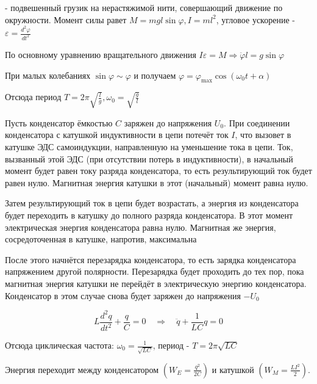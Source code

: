 \documentclass[12pt]{article}
\begin{document}
 - подвешенный грузик на нерастяжимой нити, совершающий движение по окружности.
Момент силы равет $M = m g l \sin \varphi, I = m l^2$, угловое ускорение - $\varepsilon = \frac{d^2 \varphi}{d t^2}$

По основному уравнению вращательного движения $I \varepsilon = M \Longrightarrow \ddot \varphi l = g \sin \varphi$

При малых колебаниях $\sin \varphi \sim \varphi$ и получаем $\varphi = \varphi_{\max} \cos (\omega_0 t + \alpha)$

Отсюда период $T = 2\pi\sqrt{\frac{l}{g}}, \omega_0 = \sqrt{\frac{g}{l}}$

Пусть конденсатор ёмкостью $C$ заряжен до напряжения $U_0$. 
При соединении конденсатора с катушкой индуктивности в цепи потечёт ток $I$, 
что вызовет в катушке ЭДС самоиндукции, направленную на уменьшение тока в цепи. 
Ток, вызванный этой ЭДС (при отсутствии потерь в индуктивности), 
в начальный момент будет равен току разряда конденсатора, то есть результирующий ток будет равен нулю. 
Магнитная энергия катушки в этот (начальный) момент равна нулю.

Затем результирующий ток в цепи будет возрастать, а энергия из конденсатора будет переходить 
в катушку до полного разряда конденсатора. В этот момент электрическая энергия конденсатора равна нулю. 
Магнитная же энергия, сосредоточенная в катушке, напротив, максимальна

После этого начнётся перезарядка конденсатора, то есть зарядка конденсатора напряжением другой полярности. 
Перезарядка будет проходить до тех пор, пока магнитная энергия катушки не перейдёт в электрическую энергию 
конденсатора. Конденсатор в этом случае снова будет заряжен до напряжения $-U_0$

\[
L\frac{d^2q}{dt^2} + \frac{q}{C} = 0 \quad \Longrightarrow \quad \ddot{q} + \frac{1}{LC}q = 0
\]

Отсюда циклическая частота: $\omega_0 = \frac{1}{\sqrt{LC}}$, период - $T = 2\pi\sqrt{LC}$

Энергия переходит между конденсатором $\left(W_E = \frac{q^2}{2C}\right)$ и катушкой $\left(W_M = \frac{LI^2}{2}\right)$.



\end{document}
